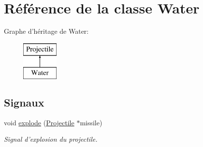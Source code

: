 \hypertarget{classWater}{
\section{Référence de la classe Water}
\label{classWater}
}
Graphe d'héritage de Water:\begin{figure}[H]
\begin{center}
\leavevmode
\includegraphics[height=2.000000cm]{classWater}
\end{center}
\end{figure}
\subsection*{Signaux}
\begin{DoxyCompactItemize}
\item 
void \hyperlink{classProjectile_a18d1fccd74f92b54f239c13c74cbc00c}{explode} (\hyperlink{classProjectile}{Projectile} $\ast$missile)
\begin{DoxyCompactList}\small\item\em Signal d'explosion du projectile. \end{DoxyCompactList}\end{DoxyCompactItemize}
